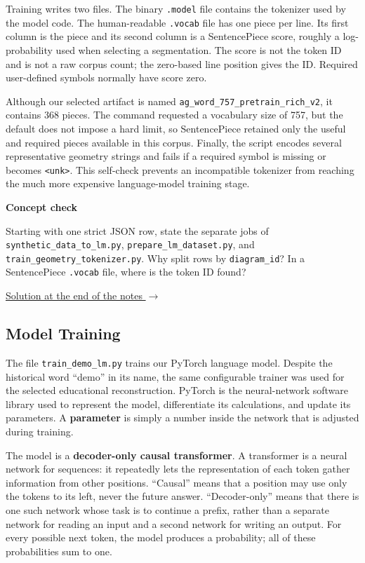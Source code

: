 \documentclass[reqno]{amsart}
\newcounter{conceptcheck}
\newenvironment{conceptcheck}[1]{%
    \refstepcounter{conceptcheck}%
    \def\conceptcheckid{#1}%
    \label{cc:#1}%
    \hypertarget{ccq:#1}{}%
    \par\medskip
    \noindent\begingroup
    \setlength{\fboxsep}{7pt}%
    \setlength{\fboxrule}{0.8pt}%
    \begin{lrbox}{\conceptcheckbox}%
    \begin{minipage}{\dimexpr\linewidth-2\fboxsep-2\fboxrule\relax}%
    \setlength{\parindent}{0pt}%
    \small
    \textbf{\color{conceptborder}Concept check \theconceptcheck}\par\smallskip
}{%
    \par\smallskip
    \hfill\hyperlink{cca:\conceptcheckid}{%
        \textcolor{conceptborder}{Solution at the end of the notes $\rightarrow$}}%
    \end{minipage}%
    \end{lrbox}%
    \fcolorbox{conceptborder}{conceptbg}{\usebox{\conceptcheckbox}}%
    \endgroup
    \medskip
}
\newcommand{\keyterm}[1]{\textbf{\color{agblue}#1}}
\DeclareMathOperator{\1}{\textbf{1}}
\begin{document}
Training writes two files.  The binary \verb|.model| file contains the
tokenizer used by the model code.  The human-readable \verb|.vocab| file has
one piece per line.  Its first column is the piece and its second column is a
SentencePiece score, roughly a log-probability used when selecting a
segmentation.  The score is not the token ID and is not a raw corpus count;
the zero-based line position gives the ID.  Required user-defined symbols
normally have score zero.

Although our selected artifact is named
\verb|ag_word_757_pretrain_rich_v2|, it contains 368 pieces.  The command
requested a vocabulary size of 757, but the default does not impose a hard
limit, so SentencePiece retained only the useful and required pieces available
in this corpus.  Finally, the script encodes several representative geometry
strings and fails if a required symbol is missing or becomes \verb|<unk>|.
This self-check prevents an incompatible tokenizer from reaching the much more
expensive language-model training stage.

\begin{conceptcheck}{lm-data-pipeline}
Starting with one strict JSON row, state the separate jobs of
\verb|synthetic_data_to_lm.py|, \verb|prepare_lm_dataset.py|, and
\verb|train_geometry_tokenizer.py|. Why split rows by \verb|diagram_id|? In a
SentencePiece \verb|.vocab| file, where is the token ID found?
\end{conceptcheck}

\subsection{Model Training}
\label{sec:model-training}

The file \verb|train_demo_lm.py| trains our PyTorch language model.  Despite
the historical word ``demo'' in its name, the same configurable trainer was
used for the selected educational reconstruction.  PyTorch is the
neural-network software library used to represent the model, differentiate its
calculations, and update its parameters.  A \keyterm{parameter} is simply a
number inside the network that is adjusted during training.

The model is a \keyterm{decoder-only causal transformer}.  A transformer is a
neural network for sequences: it repeatedly lets the representation of each
token gather information from other positions.  ``Causal'' means that a
position may use only the tokens to its left, never the future answer.
``Decoder-only'' means that there is one such network whose task is to
continue a prefix, rather than a separate network for reading an input and a
second network for writing an output.  For every possible next token, the
model produces a probability; all of these probabilities sum to one.
\end{document}
